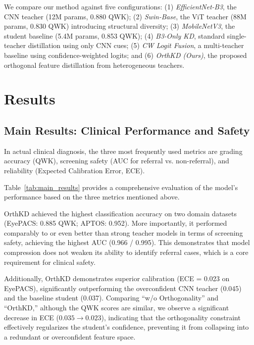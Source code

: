 \documentclass{article}
\begin{document}
We compare our method against five configurations: (1) \textit{EfficientNet-B3}, the CNN teacher (12M params, 0.880 QWK); (2) \textit{Swin-Base}, the ViT teacher (88M params, 0.830 QWK) introducing structural diversity; (3) \textit{MobileNetV3}, the student baseline (5.4M params, 0.853 QWK); (4) \textit{B3-Only KD}, standard single-teacher distillation using only CNN cues; (5) \textit{CW Logit Fusion}, a multi-teacher baseline using confidence-weighted logits; and (6) \textit{OrthKD (Ours)}, the proposed orthogonal feature distillation from heterogeneous teachers.

\section{Results}

\subsection{Main Results: Clinical Performance and Safety}

In actual clinical diagnosis, the three most frequently used metrics are grading accuracy (QWK), screening safety (AUC for referral vs. non-referral), and reliability (Expected Calibration Error, ECE).

Table~\ref{tab:main_results} provides a comprehensive evaluation of the model's performance based on the three metrics mentioned above.

OrthKD achieved the highest classification accuracy on two domain datasets (EyePACS: 0.885 QWK; APTOS: 0.952). More importantly, it performed comparably to or even better than strong teacher models in terms of screening safety, achieving the highest AUC (0.966 / 0.995). This demonstrates that model compression does not weaken its ability to identify referral cases, which is a core requirement for clinical safety.

Additionally, OrthKD demonstrates superior calibration (ECE = 0.023 on EyePACS), significantly outperforming the overconfident CNN teacher (0.045) and the baseline student (0.037). Comparing ``w/o Orthogonality'' and ``OrthKD,'' although the QWK scores are similar, we observe a significant decrease in ECE ($0.035 \to 0.023$), indicating that the orthogonality constraint effectively regularizes the student's confidence, preventing it from collapsing into a redundant or overconfident feature space.
\end{document}
